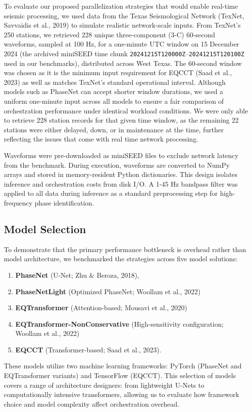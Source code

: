 To evaluate our proposed parallelization strategies that would enable real-time seismic processing, we used data from the Texas Seismological Network (TexNet, Savvaidis et al., 2019) to simulate realistic network-scale inputs. From TexNet's 250 stations, we retrieved 228 unique three-component (3-C) 60-second waveforms, sampled at 100 Hz, for a one-minute UTC window on 15 December 2024 (the archived miniSEED time chunk \texttt{20241215T120000Z}--\texttt{20241215T120100Z} used in our benchmarks), distributed across West Texas. The 60-second window was chosen as it is the minimum input requirement for EQCCT (Saad et al., 2023) as well as matches TexNet's standard operational interval. Although models such as PhaseNet can accept shorter window durations, we used a uniform one-minute input across all models to ensure a fair comparison of orchestration performance under identical workload conditions. We were only able to retrieve 228 station records for that given time window, as the remaining 22 stations were either delayed, down, or in maintenance at the time, further reflecting the issues that come with real time network processing.

Waveforms were pre-downloaded as miniSEED files to exclude network latency from the benchmark. During execution, waveforms are converted to NumPy arrays and stored in memory-resident Python dictionaries. This design isolates inference and orchestration costs from disk I/O. A 1-45 Hz bandpass filter was applied to all data during inference as a standard preprocessing step for high-frequency phase identification.

\subsection{Model Selection}

To demonstrate that the primary performance bottleneck is overhead rather than model architecture, we benchmarked the strategies across five model solutions:

\begin{enumerate}
\item \textbf{PhaseNet} (U-Net; Zhu \& Beroza, 2018),
\item \textbf{PhaseNetLight} (Optimized PhaseNet; Woollam et al., 2022)
\item \textbf{EQTransformer} (Attention-based; Mousavi et al., 2020)
\item \textbf{EQTransformer-NonConservative} (High-sensitivity configuration; Woollam et al., 2022)
\item \textbf{EQCCT} (Transformer-based; Saad et al., 2023).
\end{enumerate}
These models utilize two machine learning frameworks: PyTorch (PhaseNet and EQTransformer variants) and TensorFlow (EQCCT). This selection of models covers a range of architecture designers: from lightweight U-Nets to computationally intensive transformers, allowing us to evaluate how framework choice and model complexity affect orchestration overhead.

